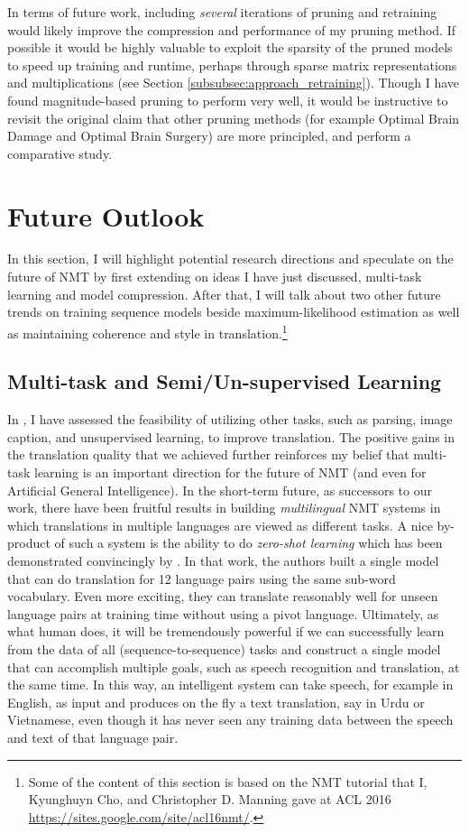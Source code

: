 In terms of future work, including \emph{several} iterations of pruning and retraining would likely improve the compression and performance of my pruning method.
If possible it would be highly valuable to exploit the sparsity of the pruned
models to speed up training and runtime, perhaps through sparse matrix
representations and multiplications (see Section \ref{subsubsec:approach_retraining}).
Though I have found magnitude-based pruning to perform very well, it would be instructive to revisit the original claim that other pruning methods (for example Optimal Brain Damage and Optimal Brain Surgery) are more principled, and perform a comparative study.

\section{Future Outlook}
\label{sec:outlook}
In this section, I will highlight potential research directions and speculate on the future of NMT by first extending on ideas I have just discussed, multi-task learning and model compression. After that, I will talk about two other future trends on training sequence models beside maximum-likelihood estimation as well as maintaining coherence and style in translation.\footnote{Some of the content of this section is based on the NMT tutorial that I, Kyunghuyn Cho, and Christopher D. Manning gave at ACL 2016 \url{https://sites.google.com/site/acl16nmt/}.}

\subsection{Multi-task and Semi/Un-supervised Learning}
In , I have assessed the feasibility of utilizing other tasks, such as parsing, image caption, and unsupervised learning, to improve translation. The positive gains in the translation quality that we achieved further reinforces my belief that multi-task learning is an important direction for the future of NMT (and even for Artificial General Intelligence). In the short-term future, as successors to our work, there have been fruitful results in building {\it multilingual} NMT systems \cite{zoph16,firat16,gnmt16multi,ha16} in which translations in multiple languages are viewed as different tasks. A nice by-product of such a system is the ability to do {\it zero-shot learning} which has been demonstrated convincingly by . In that work, the authors built a single model that can do translation for 12 language pairs using the same sub-word vocabulary. Even more exciting, they can translate reasonably well for unseen language pairs at training time without using a pivot language. Ultimately, as what human does, it will be tremendously powerful if we can successfully learn from the data of all (sequence-to-sequence) tasks and construct a single model that can accomplish multiple goals, such as speech recognition and translation, at the same time. In this way, an intelligent system can take speech, for example in English, as input and produces on the fly a text translation, say in Urdu or Vietnamese, even though it has never seen any training data between the speech and text of that language pair.

